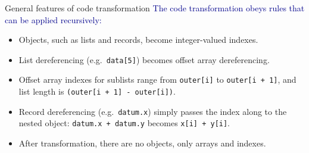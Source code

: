 \documentclass[aspectratio=169]{beamer}
\begin{document}



\begin{frame}{General features of code transformation}
\vspace{0.5 cm}
\large
\textcolor{darkblue}{The code transformation obeys rules that can be applied recursively:}

\vspace{0.1 cm}
\begin{itemize}\setlength{\itemsep}{0.25 cm}
\item Objects, such as lists and records, become integer-valued indexes.
\item List dereferencing (e.g.\ {\tt\normalsize data[5]}) becomes offset array dereferencing.
\item Offset array indexes for sublists range from {\tt\normalsize outer[i]} to {\tt\normalsize outer[i~+~1]}, and list length is {\tt\normalsize (outer[i + 1] - outer[i])}.
\item Record dereferencing (e.g.\ {\tt\normalsize datum.x}) simply passes the index along to the nested object: {\tt\normalsize datum.x + datum.y} becomes {\tt\normalsize x[i] + y[i]}.
\item After transformation, there are no objects, only arrays and indexes.
\end{itemize}

\normalsize
\vspace{0.25 cm}

\vspace{0.15 cm}
\end{frame}
\end{document}
